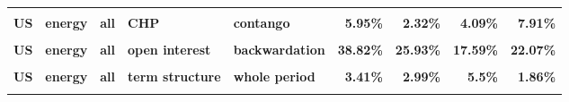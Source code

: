 \documentclass[
  authoryear,
  preprint,
  3p]{elsarticle}
\begin{document}
\begin{landscape}
\begin{longtable}[t]{>{}l>{}l>{}l>{}l>{}l>{}r>{}r>{}r>{}r}
\textbf{\cellcolor{gray!10}{US}} & \textbf{\cellcolor{gray!10}{energy}} & \textbf{\cellcolor{gray!10}{all}} & \textbf{\cellcolor{gray!10}{CHP}} & \textbf{\cellcolor{gray!10}{backwardation}} & \textcolor[HTML]{4285f4}{\textbf{\cellcolor{gray!10}{12.81\%}}} & \textcolor[HTML]{4285f4}{\textbf{\cellcolor{gray!10}{1.01\%}}} & \textcolor[HTML]{4285f4}{\textbf{\cellcolor{gray!10}{2.97\%}}} & \textcolor[HTML]{4285f4}{\textbf{\cellcolor{gray!10}{5.68\%}}}\\
\textbf{US} & \textbf{energy} & \textbf{all} & \textbf{CHP} & \textbf{contango} & \textcolor[HTML]{4285f4}{\textbf{5.95\%}} & \textcolor[HTML]{4285f4}{\textbf{2.32\%}} & \textcolor[HTML]{4285f4}{\textbf{4.09\%}} & \textcolor[HTML]{4285f4}{\textbf{7.91\%}}\\
\textbf{\cellcolor{gray!10}{US}} & \textbf{\cellcolor{gray!10}{energy}} & \textbf{\cellcolor{gray!10}{all}} & \textbf{\cellcolor{gray!10}{open interest}} & \textbf{\cellcolor{gray!10}{whole period}} & \textcolor[HTML]{4285f4}{\textbf{\cellcolor{gray!10}{40\%}}} & \textcolor[HTML]{4285f4}{\textbf{\cellcolor{gray!10}{33.46\%}}} & \textcolor[HTML]{4285f4}{\textbf{\cellcolor{gray!10}{21.16\%}}} & \textcolor[HTML]{4285f4}{\textbf{\cellcolor{gray!10}{27.67\%}}}\\
\textbf{US} & \textbf{energy} & \textbf{all} & \textbf{open interest} & \textbf{backwardation} & \textcolor[HTML]{4285f4}{\textbf{38.82\%}} & \textcolor[HTML]{4285f4}{\textbf{25.93\%}} & \textcolor[HTML]{4285f4}{\textbf{17.59\%}} & \textcolor[HTML]{4285f4}{\textbf{22.07\%}}\\
\addlinespace
\textbf{\cellcolor{gray!10}{US}} & \textbf{\cellcolor{gray!10}{energy}} & \textbf{\cellcolor{gray!10}{all}} & \textbf{\cellcolor{gray!10}{open interest}} & \textbf{\cellcolor{gray!10}{contango}} & \textcolor[HTML]{4285f4}{\textbf{\cellcolor{gray!10}{41.02\%}}} & \textcolor[HTML]{4285f4}{\textbf{\cellcolor{gray!10}{40.42\%}}} & \textcolor[HTML]{4285f4}{\textbf{\cellcolor{gray!10}{23.88\%}}} & \textcolor[HTML]{4285f4}{\textbf{\cellcolor{gray!10}{32.13\%}}}\\
\textbf{US} & \textbf{energy} & \textbf{all} & \textbf{term structure} & \textbf{whole period} & \textcolor[HTML]{4285f4}{\textbf{3.41\%}} & \textcolor[HTML]{4285f4}{\textbf{2.99\%}} & \textcolor[HTML]{4285f4}{\textbf{5.5\%}} & \textcolor[HTML]{4285f4}{\textbf{1.86\%}}\\
\textbf{\cellcolor{gray!10}{US}} & \textbf{\cellcolor{gray!10}{energy}} & \textbf{\cellcolor{gray!10}{all}} & \textbf{\cellcolor{gray!10}{term structure}} & \textbf{\cellcolor{gray!10}{backwardation}} & \textcolor[HTML]{4285f4}{\textbf{\cellcolor{gray!10}{7.4\%}}} & \textcolor[HTML]{4285f4}{\textbf{\cellcolor{gray!10}{3.75\%}}} & \textcolor[HTML]{4285f4}{\textbf{\cellcolor{gray!10}{4.93\%}}} & \textcolor[HTML]{4285f4}{\textbf{\cellcolor{gray!10}{3.4\%}}}\\

\end{longtable}
\end{landscape}
\end{document}
